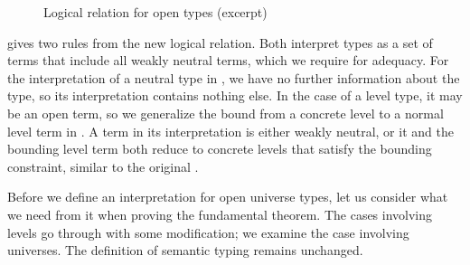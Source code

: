 \documentclass[a4paper,UKenglish,cleveref,autoref,thm-restate]{lipics-v2021}
\begin{document}
\begin{figure}
\caption{Logical relation for open types (excerpt)}
\label{fig:lr:open}
\end{figure}

 gives two rules from the new logical relation.
Both interpret types as a set of terms that include all weakly neutral terms,
which we require for adequacy.
For the interpretation of a neutral type in ,
we have no further information about the type,
so its interpretation contains nothing else.
In the case of a level type, it may be an open term,
so we generalize the bound from a concrete level to a normal level term in .
A term in its interpretation is either weakly neutral,
or it and the bounding level term both reduce to concrete levels
that satisfy the bounding constraint, similar to the original .

Before we define an interpretation for open universe types,
let us consider what we need from it when proving the fundamental theorem.
The cases involving levels go through with some modification;
we examine the case involving universes.
The definition of semantic typing remains unchanged.
\end{document}
